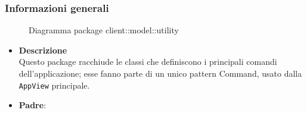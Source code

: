 \subsubsection{Informazioni generali}
\begin{figure}[H]
	\caption{Diagramma package client::model::utility}
\end{figure}
\begin{itemize}
\item \textbf{Descrizione}\\
Questo package racchiude le classi che definiscono i principali comandi dell'applicazione; esse fanno parte di un unico pattern Command, usato dalla \texttt{AppView} principale.
\item \textbf{Padre}: \hyperref[\nogloxy{swedesigner::client::model}]{}
\end{itemize}
